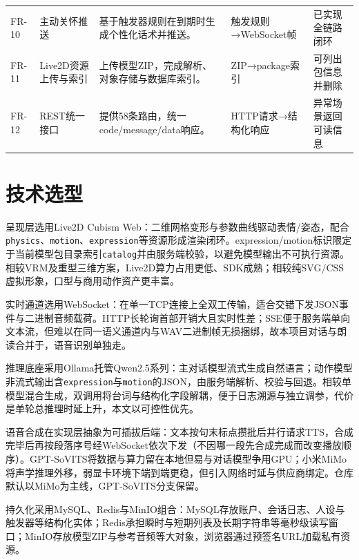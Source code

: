 \documentclass{base}
\begin{document}
\begin{table}[H]
\begin{tabularx}{\textwidth}{@{} >{\raggedright\arraybackslash}p{1.15cm} >{\raggedright\arraybackslash}p{2.35cm} Y >{\raggedright\arraybackslash}p{3.55cm} Y @{}}
        FR-10 & 主动关怀推送 & 基于触发器规则在到期时生成个性化话术并推送。 & 触发规则→WebSocket帧 & 已实现全链路闭环 \\
        FR-11 & Live2D资源上传与索引 & 上传模型ZIP，完成解析、对象存储与数据库索引。 & ZIP→package索引 & 可列出包信息并删除 \\
        FR-12 & REST统一接口 & 提供58条路由，统一code/message/data响应。 & HTTP请求→结构化响应 & 异常场景返回可读信息 \\
        \bottomrule
    \end{tabularx}
    \endgroup
\end{table}

\section{技术选型}

呈现层选用Live2D Cubism Web：二维网格变形与参数曲线驱动表情/姿态，配合\texttt{physics}、\texttt{motion}、\texttt{expression}等资源形成渲染闭环\cite{live2d}。expression/motion标识限定于当前模型包目录索引\texttt{catalog}并由服务端校验，以避免模型输出不可执行资源。相较VRM及重型三维方案，Live2D算力占用更低、SDK成熟；相较纯SVG/CSS虚拟形象，口型与商用动作资产更丰富。

实时通道选用WebSocket：在单一TCP连接上全双工传输，适合交错下发JSON事件与二进制音频载荷\cite{rfc6455,mdn-ws}。HTTP长轮询首部开销大且实时性差；SSE便于服务端单向文本流，但难以在同一语义通道内与WAV二进制帧无损捆绑，故本项目对话与朗读合并于，语音识别单独走。

推理底座采用Ollama托管Qwen2.5系列\cite{ollama}：主对话模型流式生成自然语言；动作模型非流式输出含\texttt{expression}与\texttt{motion}的JSON，由服务端解析、校验与回退。相较单模型混合生成，双调用将台词与结构化字段解耦，便于日志溯源与独立调参，代价是单轮总推理时延上升，本文以可控性优先。

语音合成在实现层抽象为可插拔后端：文本按句末标点攒批后并行请求TTS，合成完毕后再按段落序号经WebSocket依次下发（不因哪一段先合成完成而改变播放顺序）。GPT-SoVITS\cite{gptsovits}将数据与算力留在本地但易与对话模型争用GPU；小米MiMo\cite{mimoV25Docs}将声学推理外移，弱显卡环境下端到端更稳，但引入网络时延与供应商绑定。仓库默认以MiMo为主线，GPT-SoVITS分支保留。

持久化采用MySQL、Redis与MinIO组合\cite{mysql80,redis,minio}：MySQL存放账户、会话日志、人设与触发器等结构化实体；Redis承担瞬时与短期列表及长期字符串等毫秒级读写窗口；MinIO存放模型ZIP与参考音频等大对象，浏览器通过预签名URL加载私有资源。
\end{document}
